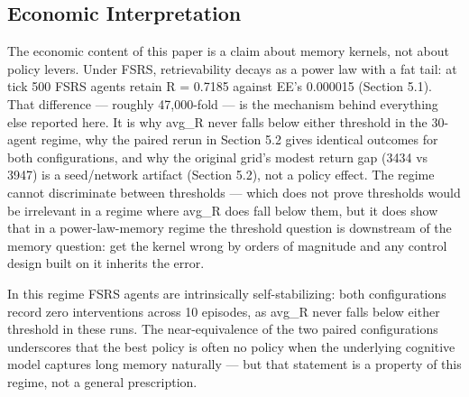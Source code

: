 \documentclass[11pt]{article}
\begin{document}
\subsection{Economic Interpretation}
The economic content of this paper is a claim about memory kernels, not about policy levers. Under FSRS, retrievability decays as a power law with a fat tail: at tick 500 FSRS agents retain R = 0.7185 against EE's 0.000015 (Section 5.1). That difference --- roughly 47,000-fold --- is the mechanism behind everything else reported here. It is why avg\_R never falls below either threshold in the 30-agent regime, why the paired rerun in Section 5.2 gives identical outcomes for both configurations, and why the original grid's modest return gap (3434 vs 3947) is a seed/network artifact (Section 5.2), not a policy effect. The regime cannot discriminate between thresholds --- which does not prove thresholds would be irrelevant in a regime where avg\_R does fall below them, but it does show that in a power-law-memory regime the threshold question is downstream of the memory question: get the kernel wrong by orders of magnitude and any control design built on it inherits the error.

In this regime FSRS agents are intrinsically self-stabilizing: both configurations record zero interventions across 10 episodes, as avg\_R never falls below either threshold in these runs. The near-equivalence of the two paired configurations underscores that the best policy is often no policy when the underlying cognitive model captures long memory naturally --- but that statement is a property of this regime, not a general prescription.
\end{document}

